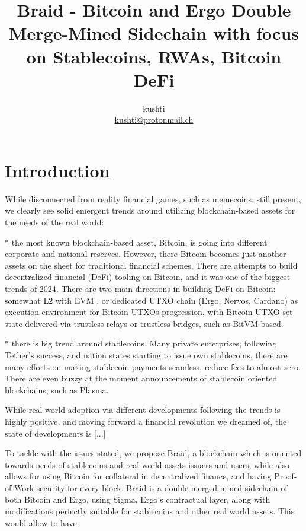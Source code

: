 \documentclass{llncs}   %
\newcommand{\bc}{Braid}
\begin{document}
\title{\bc{} - Bitcoin and Ergo Double Merge-Mined Sidechain with focus on Stablecoins, RWAs, Bitcoin DeFi}

\author{kushti \\ \href{mailto:kushti@protonmail.ch}{kushti@protonmail.ch}}


\maketitle

\begin{abstract}
\end{abstract}

\section{Introduction}

While disconnected from reality financial games, such as memecoins, still present, we clearly see solid emergent trends around utilizing 
blockchain-based assets for the needs of the real world:

* the most known blockchain-based asset, Bitcoin, is going into different corporate and national reserves. However, there Bitcoin becomes just another assets on the sheet for traditional financial schemes. There are attempts to build decentralized financial (DeFi) tooling on Bitcoin, and it was one of the biggest trends of 2024. There are two main directions in building DeFi on Bitcoin: somewhat L2 with EVM , or dedicated UTXO chain (Ergo, Nervos, Cardano) as execution environment for Bitcoin UTXOs progression, with Bitcoin UTXO set state delivered via trustless relays or trustless bridges, such as BitVM-based.

* there is big trend around stablecoins. Many private enterprises, following Tether's success, and nation states starting to issue own stablecoins, there are many efforts on making stablecoin payments seamless, reduce fees to almost zero. There are even buzzy at the moment 
announcements of stablecoin oriented blockchains, such as Plasma. 

While real-world adoption via different developments following the trends is highly positive, and moving forward a financial revolution we dreamed of, the state of developments is [...]


To tackle with the issues stated, we propose \bc{}, a blockchain which is oriented towards needs of stablecoins and real-world assets  issuers and users, while also allows for using Bitcoin for collateral in decentralized finance, and having Proof-of-Work security for every block. \bc{} is a double merged-mined sidechain of both Bitcoin and Ergo, using Sigma, Ergo's contractual layer, along with modifications perfectly suitable for stablecoins and other real world assets. This would allow to have:
\end{document}
